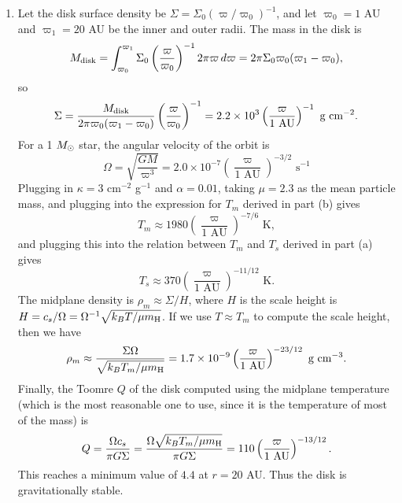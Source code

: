 \begin{enumerate}
\begin{enumerate}
\item Let the disk surface density be $\Sigma=\Sigma_0 (\varpi/\varpi_0)^{-1}$, and let $\varpi_0=1$ AU and $\varpi_1=20$ AU be the inner and outer radii. The mass in the disk is
\begin{displaymath}
M_{\rm disk} = \int_{\varpi_0}^{\varpi_1} \Sigma_0 \left(\frac{\varpi}{\varpi_0}\right)^{-1} 2 \pi \varpi \, d\varpi 
= 2 \pi \Sigma_0 \varpi_0 (\varpi_1 - \varpi_0),
\end{displaymath}
so 
\begin{displaymath}
\Sigma = \frac{M_{\rm disk}}{2 \pi \varpi_0 (\varpi_1 - \varpi_0)} \left(\frac{\varpi}{\varpi_0}\right)^{-1} = 2.2\times 10^3\left(\frac{\varpi}{1\mbox{ AU}}\right)^{-1}\mbox{ g cm}^{-2}.
\end{displaymath}
For a 1 $M_{\odot}$ star, the angular velocity of the orbit is
\begin{displaymath}
\Omega = \sqrt{\frac{GM}{\varpi^3}} = 2.0\times 10^{-7} \left(\frac{\varpi}{1\mbox{ AU}}\right)^{-3/2}\mbox{ s}^{-1}
\end{displaymath}
Plugging in $\kappa=3$ cm$^{-2}$ g$^{-1}$ and $\alpha=0.01$, taking $\mu=2.3$ as the mean particle mass, and plugging into the expression for $T_m$ derived in part (b) gives
\begin{displaymath}
T_m \approx 1980 \left(\frac{\varpi}{1\mbox{ AU}}\right)^{-7/6}\mbox{ K},
\end{displaymath}
and plugging this into the relation between $T_m$ and $T_s$ derived in part (a) gives
\begin{displaymath}
T_s \approx 370 \left(\frac{\varpi}{1\mbox{ AU}}\right)^{-11/12}\mbox{ K}.
\end{displaymath}
The midplane density is $\rho_m\approx \Sigma/H$, where $H$ is the scale height is $H = c_s/\Omega = \Omega^{-1}\sqrt{k_B T/\mu m_{\rm H}}$. If we use $T\approx T_m$ to compute the scale height, then we have
\begin{displaymath}
\rho_m \approx \frac{\Sigma\Omega}{\sqrt{k_B T_m/\mu m_{\rm H}}} = 1.7\times 10^{-9} \left(\frac{\varpi}{1\mbox{ AU}}\right)^{-23/12}\mbox{ g cm}^{-3}.
\end{displaymath}
Finally, the Toomre $Q$ of the disk computed using the midplane temperature (which is the most reasonable one to use, since it is the temperature of most of the mass) is
\begin{displaymath}
Q = \frac{\Omega c_s}{\pi G \Sigma} = \frac{\Omega \sqrt{k_B T_m/\mu m_{\rm H}}}{\pi G \Sigma} = 110 \left(\frac{\varpi}{1\mbox{ AU}}\right)^{-13/12}.
\end{displaymath}
This reaches a minimum value of $4.4$ at $r=20$ AU. Thus the disk is gravitationally stable.

\end{enumerate}

\end{enumerate}
